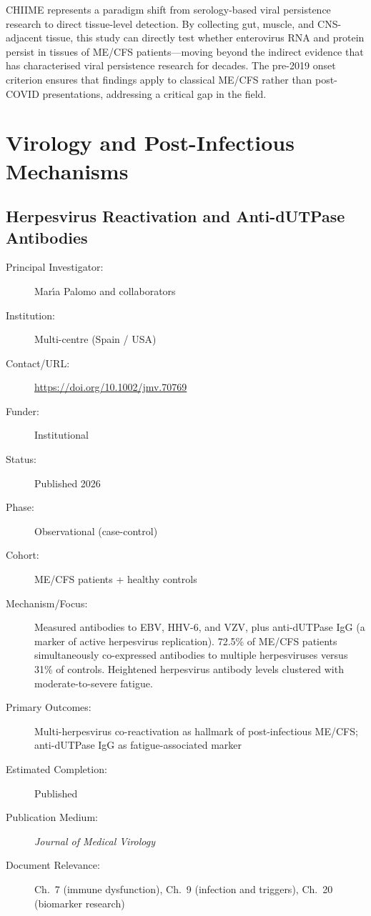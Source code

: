 CHIIME represents a paradigm shift from serology-based viral persistence
research to direct tissue-level detection.  By collecting gut, muscle, and
CNS-adjacent tissue, this study can directly test whether enterovirus RNA
and protein persist in tissues of ME/CFS patients---moving beyond the
indirect evidence that has characterised viral persistence research for
decades.  The pre-2019 onset criterion ensures that findings apply to
classical ME/CFS rather than post-COVID presentations, addressing a
critical gap in the field.

\section{Virology and Post-Infectious Mechanisms}
\label{sec:registry-virology}

\subsection{Herpesvirus Reactivation and Anti-dUTPase Antibodies}
\label{sec:registry-herpesvirus-reactivation}

\begin{description}
    \item[Principal Investigator:] Mar{\'\i}a Palomo and collaborators
    \item[Institution:] Multi-centre (Spain / USA)
    \item[Contact/URL:] \url{https://doi.org/10.1002/jmv.70769}
    \item[Funder:] Institutional
    \item[Status:] Published 2026
    \item[Phase:] Observational (case-control)
    \item[Cohort:] ME/CFS patients + healthy controls
    \item[Mechanism/Focus:] Measured antibodies to EBV, HHV-6, and VZV, plus
        anti-dUTPase IgG (a marker of active herpesvirus replication).
        72.5\% of ME/CFS patients simultaneously co-expressed antibodies to
        multiple herpesviruses versus 31\% of controls.  Heightened
        herpesvirus antibody levels clustered with moderate-to-severe fatigue.
    \item[Primary Outcomes:] Multi-herpesvirus co-reactivation as hallmark of
        post-infectious ME/CFS; anti-dUTPase IgG as fatigue-associated marker
    \item[Estimated Completion:] Published
    \item[Publication Medium:] \textit{Journal of Medical Virology}
    \item[Document Relevance:] Ch.~7 (immune dysfunction), Ch.~9
        (infection and triggers), Ch.~20 (biomarker research)
\end{description}

